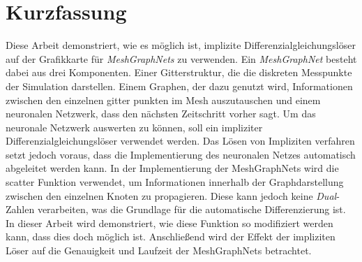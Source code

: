 \chapter*{Kurzfassung}

Diese Arbeit demonstriert, wie es möglich ist, implizite Differenzialgleichungslöser 
auf der Grafikkarte für \textit{MeshGraphNets} zu verwenden.
Ein \textit{MeshGraphNet} besteht dabei aus drei Komponenten.
Einer Gitterstruktur, die die diskreten Messpunkte der Simulation darstellen.
Einem Graphen, der dazu genutzt wird, Informationen zwischen den einzelnen gitter punkten im Mesh auszutauschen
und einem neuronalen Netzwerk, dass den nächsten Zeitschritt vorher sagt.
Um das neuronale Netzwerk auswerten zu können, soll ein impliziter Differenzialgleichungslöser verwendet werden.
Das Lösen von Impliziten verfahren setzt jedoch voraus, dass die Implementierung des neuronalen
Netzes automatisch abgeleitet werden kann.
In der Implementierung der MeshGraphNets wird die scatter Funktion verwendet, um Informationen
innerhalb der Graphdarstellung zwischen den einzelnen Knoten zu propagieren.
Diese kann jedoch keine \textit{Dual}-Zahlen verarbeiten, was die Grundlage für die automatische Differenzierung ist.
In dieser Arbeit wird demonstriert, wie diese Funktion so modifiziert werden kann, dass dies doch möglich ist.
Anschließend wird der Effekt der impliziten Löser auf die Genauigkeit und Laufzeit der MeshGraphNets betrachtet.

\cleardoublepage
